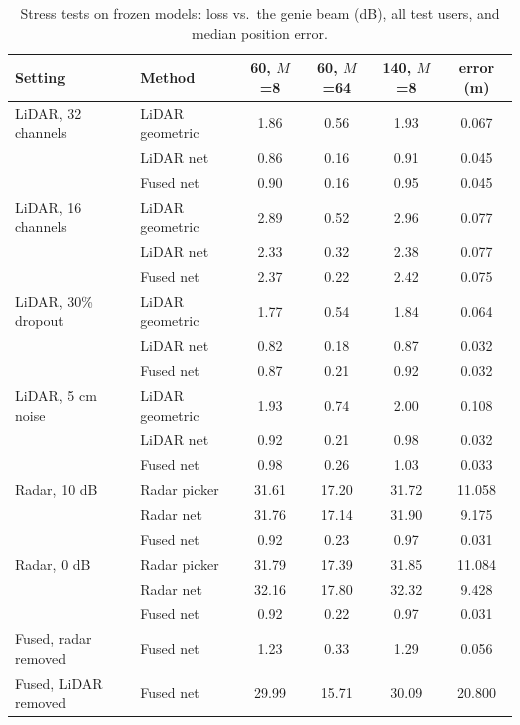 \begin{table}[t]\centering\caption{Stress tests on frozen models: loss vs.\ the genie beam (dB), all test users, and median position error.}\label{tab:stress}
\small\begin{tabular}{@{}llcccc@{}}\toprule
Setting & Method & 60, $M$=8 & 60, $M$=64 & 140, $M$=8 & error (m) \\\midrule
LiDAR, 32 channels & LiDAR geometric & 1.86 & 0.56 & 1.93 & 0.067 \\
 & LiDAR net & 0.86 & 0.16 & 0.91 & 0.045 \\
 & Fused net & 0.90 & 0.16 & 0.95 & 0.045 \\
LiDAR, 16 channels & LiDAR geometric & 2.89 & 0.52 & 2.96 & 0.077 \\
 & LiDAR net & 2.33 & 0.32 & 2.38 & 0.077 \\
 & Fused net & 2.37 & 0.22 & 2.42 & 0.075 \\
LiDAR, 30\% dropout & LiDAR geometric & 1.77 & 0.54 & 1.84 & 0.064 \\
 & LiDAR net & 0.82 & 0.18 & 0.87 & 0.032 \\
 & Fused net & 0.87 & 0.21 & 0.92 & 0.032 \\
LiDAR, 5 cm noise & LiDAR geometric & 1.93 & 0.74 & 2.00 & 0.108 \\
 & LiDAR net & 0.92 & 0.21 & 0.98 & 0.032 \\
 & Fused net & 0.98 & 0.26 & 1.03 & 0.033 \\
Radar, 10 dB & Radar picker & 31.61 & 17.20 & 31.72 & 11.058 \\
 & Radar net & 31.76 & 17.14 & 31.90 & 9.175 \\
 & Fused net & 0.92 & 0.23 & 0.97 & 0.031 \\
Radar, 0 dB & Radar picker & 31.79 & 17.39 & 31.85 & 11.084 \\
 & Radar net & 32.16 & 17.80 & 32.32 & 9.428 \\
 & Fused net & 0.92 & 0.22 & 0.97 & 0.031 \\
Fused, radar removed & Fused net & 1.23 & 0.33 & 1.29 & 0.056 \\
Fused, LiDAR removed & Fused net & 29.99 & 15.71 & 30.09 & 20.800 \\
\bottomrule\end{tabular}\end{table}
